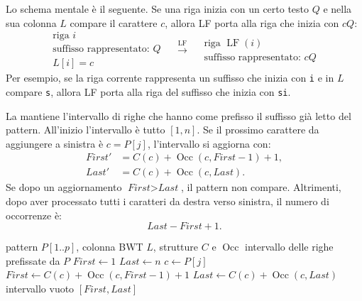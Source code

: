 \documentclass{article}
\theoremstyle{definition}
\numberwithin{equation}{section}
\begin{document}
Lo schema mentale è il seguente. Se una riga inizia con un certo testo $Q$ e nella sua colonna $L$ compare il carattere $c$, allora LF porta alla riga che inizia con $cQ$:
\[
    \boxed{
        \begin{array}{c}
            \text{riga } i                    \\
            \text{suffisso rappresentato: } Q \\
            L[i]=c
        \end{array}
    }
    \quad
    \xrightarrow{\operatorname{LF}}
    \quad
    \boxed{
        \begin{array}{c}
            \text{riga } \operatorname{LF}(i) \\
            \text{suffisso rappresentato: } cQ
        \end{array}
    }
\]
Per esempio, se la riga corrente rappresenta un suffisso che inizia con \texttt{i} e in $L$ compare \texttt{s}, allora LF porta alla riga del suffisso che inizia con \texttt{si}.

La \textbf{} mantiene l'intervallo di righe che hanno come prefisso il suffisso già letto del pattern. All'inizio l'intervallo è tutto $[1,n]$. Se il prossimo carattere da aggiungere a sinistra è $c=P[j]$, l'intervallo si aggiorna con:
\begin{align}
    \textit{First}' & =
    C(c)+\operatorname{Occ}(c,\textit{First}-1)+1,
    \label{eq:fm_backward_first} \\
    \textit{Last}'  & =
    C(c)+\operatorname{Occ}(c,\textit{Last}).
    \label{eq:fm_backward_last}
\end{align}
Se dopo un aggiornamento $\textit{First}>\textit{Last}$, il pattern non compare. Altrimenti, dopo aver processato tutti i caratteri da destra verso sinistra, il numero di occorrenze è:
\[
    \textit{Last}-\textit{First}+1.
\]

\begin{algorithm}[htpb]
    \caption{}
    \begin{algorithmic}[1]
        \Require pattern $P[1..p]$, colonna BWT $L$, strutture $C$ e $\operatorname{Occ}$
        \Ensure intervallo delle righe prefissate da $P$
        \State $\textit{First}\gets 1$
        \State $\textit{Last}\gets n$
        \State $c\gets P[j]$
        \State $\textit{First}\gets C(c)+\operatorname{Occ}(c,\textit{First}-1)+1$
        \State $\textit{Last}\gets C(c)+\operatorname{Occ}(c,\textit{Last})$
        \State \Return intervallo vuoto
        \EndIf
        \EndFor
        \State \Return $[\textit{First},\textit{Last}]$
    \end{algorithmic}
\end{algorithm}
\end{document}
